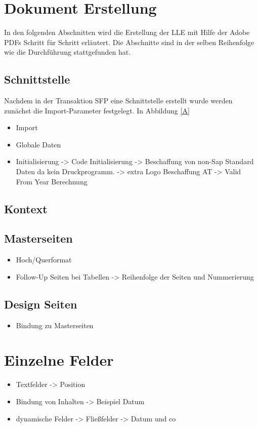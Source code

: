 \section{Dokument Erstellung}

In den folgenden Abschnitten wird die Erstellung der \ac{LLE} mit Hilfe der Adobe \ac{PDF}s Schritt für Schritt erläutert. Die Abschnitte sind in der selben Reihenfolge wie die Durchführung stattgefunden hat.
\subsection{Schnittstelle}

Nachdem in der Transaktion SFP eine Schnittstelle erstellt wurde werden zunächst die Import-Parameter festgelegt. In Abbildung \ref{A}
	\begin{itemize}
		\item Import
		\item Globale Daten
		\item Initialisierung -> Code Initialisierung -> Beschaffung von non-Sap Standard Daten da kein Druckprogramm. -> extra Logo Beschaffung AT -> Valid From Year Berechnung
	\end{itemize}
\FloatBarrier
\subsection{Kontext}
\FloatBarrier
\subsection{Masterseiten}
  \begin{itemize}
  	\item Hoch/Querformat
  	\item Follow-Up Seiten bei Tabellen -> Reihenfolge der Seiten und Nummerierung 
  \end{itemize}

\FloatBarrier
\subsection{Design Seiten}

	\begin{itemize}
		\item Bindung zu Masterseiten
	\end{itemize}
\FloatBarrier
\section{Einzelne Felder}
	\begin{itemize}
		\item Textfelder -> Position
		\item Bindung von Inhalten -> Beispiel Datum
		\item dynamische Felder -> Fließfelder -> Datum und co
	\end{itemize}
\FloatBarrier
